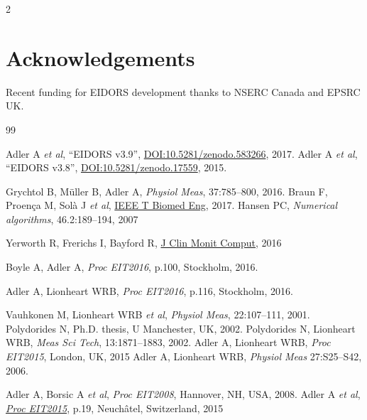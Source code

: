 \documentclass[10pt,letterpaper]{article}
\renewenvironment{thebibliography}[1]{%
    \begin{oldthebibliography}{#1}%
      \setlength{\parskip}{0ex}%
      \setlength{\itemsep}{0ex}%
  }%
  {%
    \end{oldthebibliography}%
  }
\begin{document}
\begin{multicols}{2}
\section*{Acknowledgements}
Recent funding for EIDORS development thanks to
NSERC Canada and EPSRC UK.

\footnotesize
\begin{thebibliography}{99}
   Adler A {\em et al}, ``EIDORS v3.9'',
   \href{http://dx.doi.org/10.5281/zenodo.583266}{DOI:10.5281/zenodo.583266},
    2017.
   Adler A {\em et al}, ``EIDORS v3.8'',
   \href{http://dx.doi.org/10.5281/zenodo.17559}{DOI:10.5281/zenodo.17559},
    2015.

   Grychtol B, Müller B, Adler A,
   {\em Physiol Meas}, 37:785--800, 2016.
   Braun F, Proença M, Solà J {\em et al}, \href{http://dx.doi.org/10.1109/TBME.2017.2659540}{IEEE T Biomed Eng}, 2017.
   Hansen PC, {\em Numerical algorithms}, 46.2:189--194, 2007

Yerworth R, Frerichs I, Bayford R, \href{http://dx.doi.org/10.1007/s10877-016-9920-y}{J Clin Monit Comput}, 2016

Boyle A, Adler A,
{\em Proc EIT2016}, p.100, Stockholm,  2016.

Adler A, Lionheart WRB, 
{\em Proc EIT2016}, p.116, Stockholm,  2016.

   Vauhkonen M, Lionheart WRB {\em  et al},
   {\em  Physiol Meas}, 22:107--111, 2001.
   Polydorides N,
 Ph.D. thesis, U Manchester, UK, 2002.
   Polydorides N, Lionheart WRB,
   {\em Meas Sci Tech}, 13:1871--1883, 2002.
Adler A, Lionheart WRB,
{\em Proc EIT2015}, London, UK, 2015
%
Adler A, Lionheart WRB,
{\em Physiol Meas} 27:S25--S42, 2006.

Adler A, Borsic A {\em et al},
{\em Proc EIT2008}, Hannover, NH, USA, 2008.
Adler A {\em et al}, %
\href{https://zenodo.org/record/17752}{\em Proc EIT2015}, p.19, 
 Neuchâtel, Switzerland, 2015
\end{thebibliography}
\end{multicols}
\end{document}

